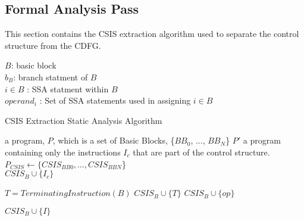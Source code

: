 
\subsection{Formal Analysis Pass}

This section contains the CSIS extraction algorithm used to separate the control structure
from the CDFG.


\noindent $B$: basic block\\
$b_B$: branch statment of $B$\\
$i \in B$ : SSA statment within $B$\\
$operand_i$ : Set of SSA statements used in assigning $i\in B$\\

\begin{algorithm}
\caption{CSIS Extraction Static Analysis Algorithm
\label{alg:CSIS-extraction}}
    \begin{algorithmic}
        \INPUT a program, $P$, which is a set of Basic Blocks, \{$BB_0$, ..., $BB_N$\}
        \OUTPUT $P'$ a program containing only the instructions $I_c$ that are part of the control structure.
        \Statex
            \State $P_{CSIS} \gets \{CSIS_{BB0}, \dots,  CSIS_{BBN}$\}
                \\\hrulefill
                        \State $CSIS_B \cup \{I_{c}\}$
                    \EndFor
                \EndFor
                \\\hrulefill

                \State $T = TerminatingInstruction(B)$
                \State $CSIS_{B} \cup \{T\}$
                    \State $CSIS_{B} \cup \{op\}$
                \EndFor
                \\\hrulefill

                                \State $CSIS_{B} \cup \{I\}$
                            \EndIf
                        \EndFor
                    \EndFor
                \EndFor
            \EndFor
        \EndWhile
    \end{algorithmic}
\end{algorithm}
